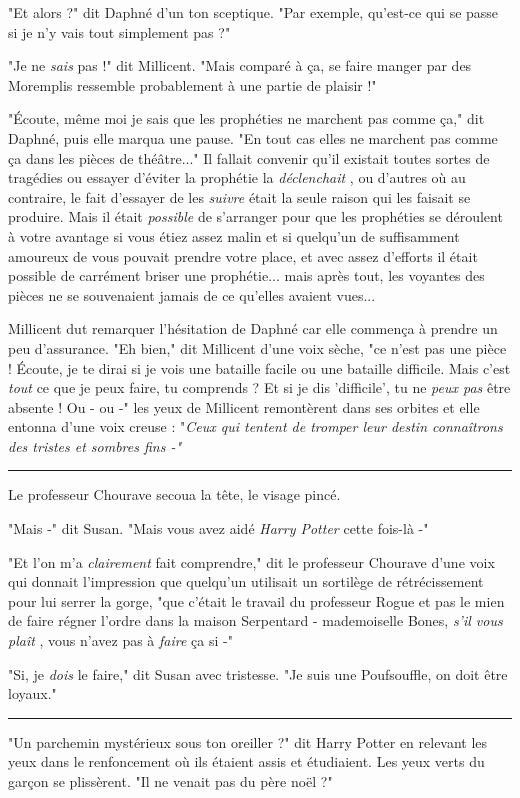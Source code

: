 "Et alors ?" dit Daphné d'un ton sceptique. "Par exemple, qu'est-ce qui se passe si je n'y vais tout simplement pas ?"

"Je ne \emph{sais}  pas !" dit Millicent. "Mais comparé à ça, se faire manger par des Moremplis ressemble probablement à une partie de plaisir !"

"Écoute, même moi je sais que les prophéties ne marchent pas comme ça," dit Daphné, puis elle marqua une pause. "En tout cas elles ne marchent pas comme ça dans les pièces de théâtre..." Il fallait convenir qu'il existait toutes sortes de tragédies ou essayer d'éviter la prophétie la \emph{déclenchait} , ou d'autres où au contraire, le fait d'essayer de les \emph{suivre}  était la seule raison qui les faisait se produire. Mais il était \emph{possible}  de s'arranger pour que les prophéties se déroulent à votre avantage si vous étiez assez malin et si quelqu'un de suffisamment amoureux de vous pouvait prendre votre place, et avec assez d'efforts il était possible de carrément briser une prophétie... mais après tout, les voyantes des pièces ne se souvenaient jamais de ce qu'elles avaient vues...

Millicent dut remarquer l'hésitation de Daphné car elle commença à prendre un peu d'assurance. "Eh bien," dit Millicent d'une voix sèche, "ce n'est pas une pièce ! Écoute, je te dirai si je vois une bataille facile ou une bataille difficile. Mais c'est \emph{tout}  ce que je peux faire, tu comprends ? Et si je dis 'difficile', tu ne \emph{peux pas}  être absente ! Ou - ou -" les yeux de Millicent remontèrent dans ses orbites et elle entonna d'une voix creuse : "\emph{Ceux qui tentent de tromper leur destin connaîtrons des tristes et sombres fins -"} 
\par\noindent\rule{\textwidth}{0.4pt}
Le professeur Chourave secoua la tête, le visage pincé.

"Mais -" dit Susan. "Mais vous avez aidé \emph{Harry Potter}  cette fois-là -"

"Et l'on m'a \emph{clairement}  fait comprendre," dit le professeur Chourave d'une voix qui donnait l'impression que quelqu'un utilisait un sortilège de rétrécissement pour lui serrer la gorge, "que c'était le travail du professeur Rogue et pas le mien de faire régner l'ordre dans la maison Serpentard - mademoiselle Bones, \emph{s'il vous plaît} , vous n'avez pas à \emph{faire}  ça si -"

"Si, je \emph{dois}  le faire," dit Susan avec tristesse. "Je suis une Poufsouffle, on doit être loyaux."
\par\noindent\rule{\textwidth}{0.4pt}
"Un parchemin mystérieux sous ton oreiller ?" dit Harry Potter en relevant les yeux dans le renfoncement où ils étaient assis et étudiaient. Les yeux verts du garçon se plissèrent. "Il ne venait pas du père noël ?"

